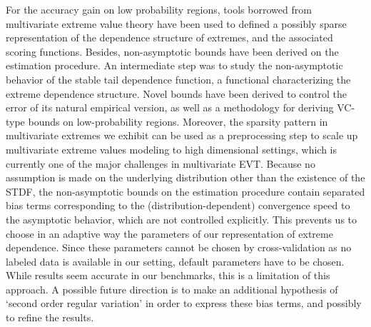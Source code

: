 For the accuracy gain on low probability regions, tools borrowed from multivariate extreme value theory have been used to defined a possibly sparse representation of the dependence structure of extremes, and the associated scoring functions. Besides, non-asymptotic bounds have been derived on the estimation procedure.
An intermediate step was to study the non-asymptotic behavior of the stable tail dependence function, a functional characterizing the extreme dependence structure. 
Novel bounds have been derived to control the error of its natural empirical version, as well as a methodology for deriving VC-type bounds on low-probability regions.
Moreover, the sparsity pattern in multivariate extremes we exhibit can be used as a preprocessing step to scale up multivariate extreme values modeling to high dimensional settings, which is currently one of the major challenges in multivariate EVT.
%
Because no assumption is made on the underlying distribution other than the existence of the STDF, the non-asymptotic bounds on the estimation procedure contain separated bias terms corresponding to the (distribution-dependent) convergence speed to the asymptotic behavior, which are not controlled explicitly.
This prevents us to choose in an adaptive way the parameters of our representation of extreme dependence. Since these parameters cannot be chosen by cross-validation as no labeled data is available in our setting, default parameters have to be chosen. While results seem accurate in our benchmarks, this is a limitation of this approach.
A possible future direction is to make an additional hypothesis of  `second order regular variation'  \citep[see \emph{e.g.}][]{deHaan1996} in order to express these bias terms, and possibly to refine the results.

